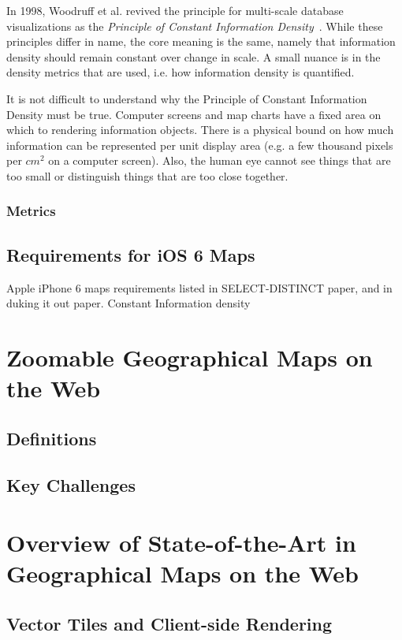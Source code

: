 \documentclass[11pt, oneside]{report}   	%
\begin{document}
In 1998, Woodruff et al. revived the principle for multi-scale database visualizations as the \emph{Principle of Constant Information Density}~\cite{woodruff1998constant}. While these principles differ in name, the core meaning is the same, namely that information density should remain constant over change in scale. A small nuance is in the density metrics that are used, i.e. how information density is quantified.

It is not difficult to understand why the Principle of Constant Information Density must be true. Computer screens and map charts have a fixed area on which to rendering information objects. There is a physical bound on how much information can be represented per unit display area (e.g. a few thousand pixels per $cm^2$ on a computer screen). Also, the human eye cannot see things that are too small or distinguish things that are too close together.

\subsubsection{Metrics}

\subsection{Requirements for iOS 6 Maps}
Apple iPhone 6 maps requirements listed in SELECT-DISTINCT paper, and in duking it out paper. Constant Information density




\section{Zoomable Geographical Maps on the Web}
\subsection{Definitions}
\subsection{Key Challenges}

\section{Overview of State-of-the-Art in Geographical Maps on the Web}
\subsection{Vector Tiles and Client-side Rendering}
\end{document}
